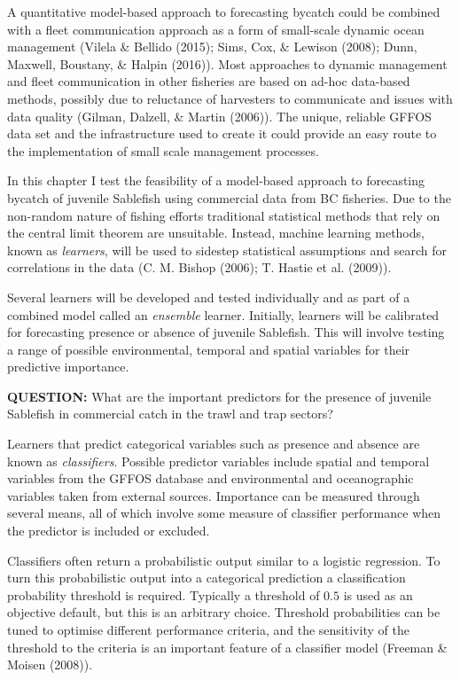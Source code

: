 \documentclass[12pt,]{scrartcl}
\begin{document}
A quantitative model-based approach to forecasting bycatch could be
combined with a fleet communication approach as a form of small-scale
dynamic ocean management (Vilela \& Bellido (2015); Sims, Cox, \&
Lewison (2008); Dunn, Maxwell, Boustany, \& Halpin (2016)). Most
approaches to dynamic management and fleet communication in other
fisheries are based on ad-hoc data-based methods, possibly due to
reluctance of harvesters to communicate and issues with data quality
(Gilman, Dalzell, \& Martin (2006)). The unique, reliable GFFOS data set
and the infrastructure used to create it could provide an easy route to
the implementation of small scale management processes.

In this chapter I test the feasibility of a model-based approach to
forecasting bycatch of juvenile Sablefish using commercial data from BC
fisheries. Due to the non-random nature of fishing efforts traditional
statistical methods that rely on the central limit theorem are
unsuitable. Instead, machine learning methods, known as \emph{learners},
will be used to sidestep statistical assumptions and search for
correlations in the data (C. M. Bishop (2006); T. Hastie et al. (2009)).

Several learners will be developed and tested individually and as part
of a combined model called an \emph{ensemble} learner. Initially,
learners will be calibrated for forecasting presence or absence of
juvenile Sablefish. This will involve testing a range of possible
environmental, temporal and spatial variables for their predictive
importance.

\textbf{QUESTION:} What are the important predictors for the presence of
juvenile Sablefish in commercial catch in the trawl and trap sectors?

Learners that predict categorical variables such as presence and absence
are known as \emph{classifiers}. Possible predictor variables include
spatial and temporal variables from the GFFOS database and environmental
and oceanographic variables taken from external sources. Importance can
be measured through several means, all of which involve some measure of
classifier performance when the predictor is included or excluded.

Classifiers often return a probabilistic output similar to a logistic
regression. To turn this probabilistic output into a categorical
prediction a classification probability threshold is required. Typically
a threshold of \(0.5\) is used as an objective default, but this is an
arbitrary choice. Threshold probabilities can be tuned to optimise
different performance criteria, and the sensitivity of the threshold to
the criteria is an important feature of a classifier model (Freeman \&
Moisen (2008)).
\end{document}
